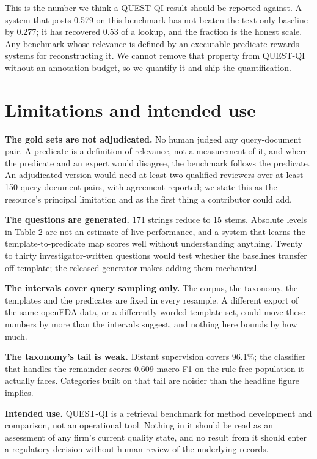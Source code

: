 \documentclass[runningheads]{llncs}
\begin{document}
This is the number we think a QUEST-QI result should be reported against. A system that posts 0.579 on this benchmark has not beaten the text-only baseline by 0.277; it has recovered 0.53 of a lookup, and the fraction is the honest scale. Any benchmark whose relevance is defined by an executable predicate rewards systems for reconstructing it. We cannot remove that property from QUEST-QI without an annotation budget, so we quantify it and ship the quantification.


\section{Limitations and intended use}
\textbf{The gold sets are not adjudicated.} No human judged any query-document pair. A predicate is a definition of relevance, not a measurement of it, and where the predicate and an expert would disagree, the benchmark follows the predicate. An adjudicated version would need at least two qualified reviewers over at least 150 query-document pairs, with agreement reported; we state this as the resource's principal limitation and as the first thing a contributor could add.

\textbf{The questions are generated.} 171 strings reduce to 15 stems. Absolute levels in Table 2 are not an estimate of live performance, and a system that learns the template-to-predicate map scores well without understanding anything. Twenty to thirty investigator-written questions would test whether the baselines transfer off-template; the released generator makes adding them mechanical.

\textbf{The intervals cover query sampling only.} The corpus, the taxonomy, the templates and the predicates are fixed in every resample. A different export of the same openFDA data, or a differently worded template set, could move these numbers by more than the intervals suggest, and nothing here bounds by how much.

\textbf{The taxonomy's tail is weak.} Distant supervision covers 96.1\%; the classifier that handles the remainder scores 0.609 macro F1 on the rule-free population it actually faces. Categories built on that tail are noisier than the headline figure implies.

\textbf{Intended use.} QUEST-QI is a retrieval benchmark for method development and comparison, not an operational tool. Nothing in it should be read as an assessment of any firm's current quality state, and no result from it should enter a regulatory decision without human review of the underlying records.
\end{document}
